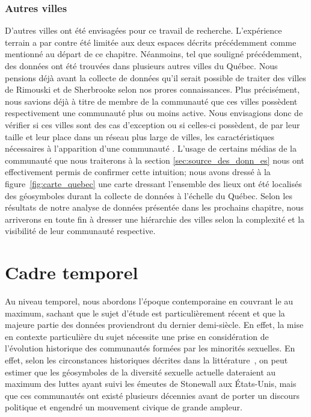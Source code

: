 \subsubsection{Autres villes}
\label{ssub:autres_villes}
D'autres villes ont été envisagées pour ce travail de recherche. 
L'expérience terrain a par contre été limitée aux deux espaces décrits précédemment comme mentionné au départ de ce chapitre. 
Néanmoins, tel que souligné précédemment, des données ont été trouvées dans plusieurs autres villes du Québec. 
Nous pensions déjà avant la collecte de données qu'il serait possible de traiter des villes de Rimouski et de Sherbrooke selon nos prores connaissances. 
Plus précisément, nous savions déjà à titre de membre de la communauté \lgbt{} que ces villes possèdent respectivement une communauté plus ou moins active. 
Nous envisagions donc de vérifier si ces villes sont des cas d'exception ou si celles-ci possèdent, de par leur taille et leur place dans un réseau plus large de villes, les caractéristiques nécessaires à l'apparition d'une communauté \lgbt.
L'usage de certains médias de la communauté que nous traiterons à la section \ref{sec:source_des_donn_es} nous ont effectivement permis de confirmer cette intuition; nous avons dressé à la figure~\ref{fig:carte_quebec} une carte dressant l'ensemble des lieux ont été localisés des géosymboles durant la collecte de données à l'échelle du Québec. 
Selon les résultats de notre analyse de données présentée dans les prochains chapitre, nous arriverons en toute fin à dresser une hiérarchie des villes selon la complexité et la visibilité de leur communauté respective.

\section{Cadre temporel}
\label{sec:cadre_temporel}
Au niveau temporel, nous abordons l'époque contemporaine en couvrant le  au maximum, sachant que le sujet d'étude est particulièrement récent et que la majeure partie des données proviendront du dernier demi-siècle. 
En effet, la mise en contexte particulière du sujet nécessite une prise en considération de l'évolution historique des communautés formées par les minorités sexuelles. 
En effet, selon les circonstances historiques décrites dans la littérature~\citep{Spencer2005}, on peut estimer que les géosymboles de la diversité sexuelle actuelle dateraient au maximum des luttes ayant suivi les émeutes de Stonewall aux États-Unis, mais que ces communautés ont existé plusieurs décennies avant de porter un discours politique et engendré un mouvement civique de grande ampleur.

